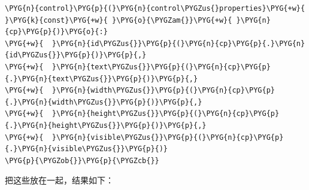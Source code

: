 \begin{codeblockbg}
\begin{Verbatim}[commandchars=\\\{\},breaklines=true,breakanywhere=true,fontsize=\codefont,xleftmargin=17bp]
\PYG{n}{control}\PYG{p}{(}\PYG{n}{control\PYGZus{}properties}\PYG{+w}{ }\PYG{k}{const}\PYG{+w}{ }\PYG{o}{\PYGZam{}}\PYG{+w}{ }\PYG{n}{cp}\PYG{p}{)}\PYG{o}{:}
\PYG{+w}{  }\PYG{n}{id\PYGZus{}}\PYG{p}{(}\PYG{n}{cp}\PYG{p}{.}\PYG{n}{id\PYGZus{}}\PYG{p}{)}\PYG{p}{,}
\PYG{+w}{  }\PYG{n}{text\PYGZus{}}\PYG{p}{(}\PYG{n}{cp}\PYG{p}{.}\PYG{n}{text\PYGZus{}}\PYG{p}{)}\PYG{p}{,}
\PYG{+w}{  }\PYG{n}{width\PYGZus{}}\PYG{p}{(}\PYG{n}{cp}\PYG{p}{.}\PYG{n}{width\PYGZus{}}\PYG{p}{)}\PYG{p}{,}
\PYG{+w}{  }\PYG{n}{height\PYGZus{}}\PYG{p}{(}\PYG{n}{cp}\PYG{p}{.}\PYG{n}{height\PYGZus{}}\PYG{p}{)}\PYG{p}{,}
\PYG{+w}{  }\PYG{n}{visible\PYGZus{}}\PYG{p}{(}\PYG{n}{cp}\PYG{p}{.}\PYG{n}{visible\PYGZus{}}\PYG{p}{)}
\PYG{p}{\PYGZob{}}\PYG{p}{\PYGZcb{}}
\end{Verbatim}
\end{codeblockbg}



把这些放在一起，结果如下：




